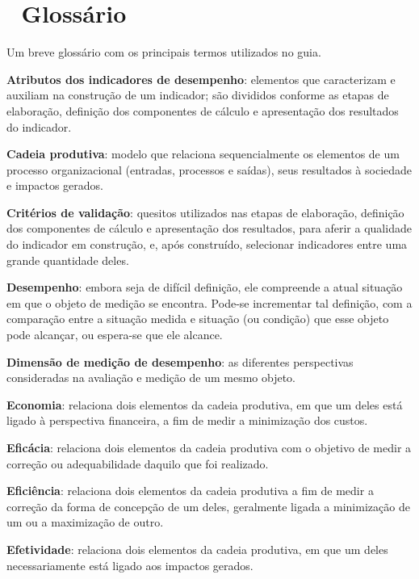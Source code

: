 \documentclass[
  letterpaper,
  DIV=11,
  numbers=noendperiod]{scrreprt}
\begin{document}

\hypertarget{glossuxe1rio}{%
\chapter*{📖 Glossário}\label{glossuxe1rio}}


{Um breve glossário com os principais termos utilizados no guia.}

\textbf{Atributos dos indicadores de desempenho}: elementos que
caracterizam e auxiliam na construção de um indicador; são divididos
conforme as etapas de elaboração, definição dos componentes de cálculo e
apresentação dos resultados do indicador.

\textbf{Cadeia produtiva}: modelo que relaciona sequencialmente os
elementos de um processo organizacional (entradas, processos e saídas),
seus resultados à sociedade e impactos gerados.

\textbf{Critérios de validação}: quesitos utilizados nas etapas de
elaboração, definição dos componentes de cálculo e apresentação dos
resultados, para aferir a qualidade do indicador em construção, e, após
construído, selecionar indicadores entre uma grande quantidade deles.

\textbf{Desempenho}: embora seja de difícil definição, ele compreende a
atual situação em que o objeto de medição se encontra. Pode-se
incrementar tal definição, com a comparação entre a situação medida e
situação (ou condição) que esse objeto pode alcançar, ou espera-se que
ele alcance.

\textbf{Dimensão de medição de desempenho}: as diferentes perspectivas
consideradas na avaliação e medição de um mesmo objeto.

\textbf{Economia}: relaciona dois elementos da cadeia produtiva, em que
um deles está ligado à perspectiva financeira, a fim de medir a
minimização dos custos.

\textbf{Eficácia}: relaciona dois elementos da cadeia produtiva com o
objetivo de medir a correção ou adequabilidade daquilo que foi
realizado.

\textbf{Eficiência}: relaciona dois elementos da cadeia produtiva a fim
de medir a correção da forma de concepção de um deles, geralmente ligada
a minimização de um ou a maximização de outro.

\textbf{Efetividade}: relaciona dois elementos da cadeia produtiva, em
que um deles necessariamente está ligado aos impactos gerados.
\end{document}
